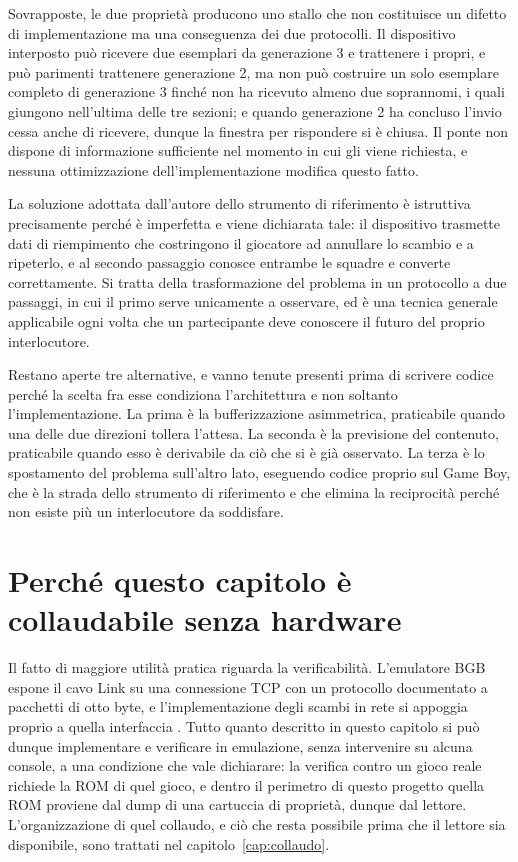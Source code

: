 Sovrapposte, le due proprietà producono uno stallo che non costituisce un difetto di implementazione ma una conseguenza dei due protocolli. Il dispositivo interposto può ricevere due esemplari da generazione 3 e trattenere i propri, e può parimenti trattenere generazione 2, ma non può costruire un solo esemplare completo di generazione 3 finché non ha ricevuto almeno due soprannomi, i quali giungono nell'ultima delle tre sezioni; e quando generazione 2 ha concluso l'invio cessa anche di ricevere, dunque la finestra per rispondere si è chiusa. Il ponte non dispone di informazione sufficiente nel momento in cui gli viene richiesta, e nessuna ottimizzazione dell'implementazione modifica questo fatto.

La soluzione adottata dall'autore dello strumento di riferimento è istruttiva precisamente perché è imperfetta e viene dichiarata tale: il dispositivo trasmette dati di riempimento che costringono il giocatore ad annullare lo scambio e a ripeterlo, e al secondo passaggio conosce entrambe le squadre e converte correttamente. Si tratta della trasformazione del problema in un protocollo a due passaggi, in cui il primo serve unicamente a osservare, ed è una tecnica generale applicabile ogni volta che un partecipante deve conoscere il futuro del proprio interlocutore.

Restano aperte tre alternative, e vanno tenute presenti prima di scrivere codice perché la scelta fra esse condiziona l'architettura e non soltanto l'implementazione. La prima è la bufferizzazione asimmetrica, praticabile quando una delle due direzioni tollera l'attesa. La seconda è la previsione del contenuto, praticabile quando esso è derivabile da ciò che si è già osservato. La terza è lo spostamento del problema sull'altro lato, eseguendo codice proprio sul Game Boy, che è la strada dello strumento di riferimento e che elimina la reciprocità perché non esiste più un interlocutore da soddisfare.

\section{Perché questo capitolo è collaudabile senza hardware}

Il fatto di maggiore utilità pratica riguarda la verificabilità. L'emulatore BGB espone il cavo Link su una connessione TCP con un protocollo documentato a pacchetti di otto byte, e l'implementazione degli scambi in rete si appoggia proprio a quella interfaccia \cite{pokemongb-online}. Tutto quanto descritto in questo capitolo si può dunque implementare e verificare in emulazione, senza intervenire su alcuna console, a una condizione che vale dichiarare: la verifica contro un gioco reale richiede la ROM di quel gioco, e dentro il perimetro di questo progetto quella ROM proviene dal dump di una cartuccia di proprietà, dunque dal lettore. L'organizzazione di quel collaudo, e ciò che resta possibile prima che il lettore sia disponibile, sono trattati nel capitolo~\ref{cap:collaudo}.

